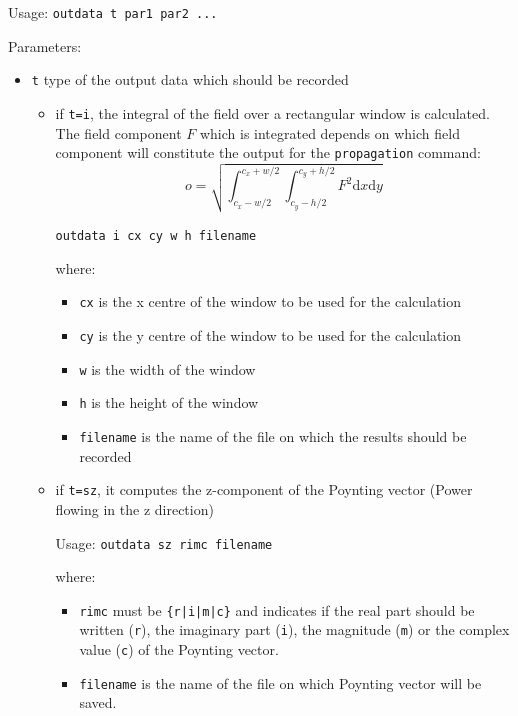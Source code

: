     Usage: \lstinline!outdata t par1 par2 ...!
    
    Parameters:
    \begin{itemize}
    \item\lstinline!t!  type of the output data which should be recorded
    \begin{itemize}
        \item if \lstinline!t=i!, the   integral of the field over a rectangular window is calculated. The field component $F$ which is integrated depends on which field component will constitute the output for the \lstinline!propagation! command:
        \begin{equation}
        o=\sqrt{\int_{c_x-w/2}^{c_x+w/2}\int_{c_y-h/2}^{c_y+h/2}F^2\mathrm{d}x\mathrm{d}y}
        \end{equation}
        
        \lstinline!outdata i cx cy w h filename!
        
        where:
        \begin{itemize}
            \item\lstinline!cx! is the x centre of the window to be used for the calculation
            \item\lstinline!cy!  is the y centre of the window to be used for the calculation
            \item\lstinline!w! is the width of the window
            \item\lstinline!h! is the height of the window
            \item\lstinline!filename! is the name of the file on which the results should be recorded
        \end{itemize}
        
		\item if \lstinline!t=sz!, it computes the z-component of the Poynting vector 
		(Power flowing in the z direction) 

		Usage: \lstinline!outdata sz rimc filename! 
		 
		where: 
		\begin{itemize}
	    	\item\lstinline!rimc!    must be \lstinline!{r|i|m|c}! and indicates if  the real part should be written
		    (\lstinline!r!), the imaginary part (\lstinline!i!), the magnitude (\lstinline!m!) or the complex 
		    value (\lstinline!c!) of the Poynting vector.
			\item \lstinline!filename! is the name of the file on which Poynting vector will be saved.
    	\end{itemize}



\end{itemize}
\end{itemize}
